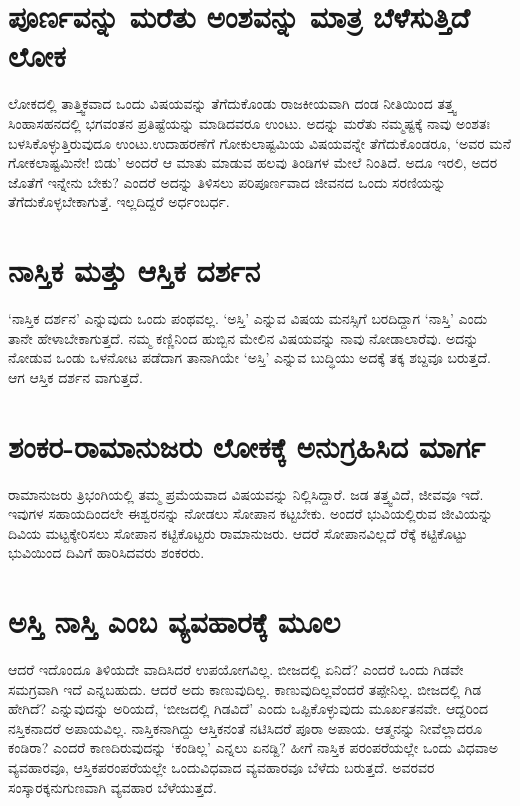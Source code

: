 \section*{ಪೂರ್ಣವನ್ನು ಮರೆತು ಅಂಶವನ್ನು ಮಾತ್ರ ಬೆಳೆಸುತ್ತಿದೆ ಲೋಕ}

ಲೋಕದಲ್ಲಿ ತಾತ್ತ್ವಿಕವಾದ ಒಂದು ವಿಷಯವನ್ನು ತೆಗೆದುಕೊಂಡು ರಾಜಕೀಯವಾಗಿ ದಂಡ ನೀತಿಯಿಂದ ತತ್ತ್ವ ಸಿಂಹಾಸಹನದಲ್ಲಿ ಭಗವಂತನ ಪ್ರತಿಷ್ಟೆಯನ್ನು ಮಾಡಿದವರೂ ಉಂಟು. ಅದನ್ನು ಮರೆತು ನಮ್ಮಷ್ಟಕ್ಕೆ ನಾವು ಅಂಶತಃ ಬಳಸಿಕೊಳ್ಳುತ್ತಿರುವುದೂ ಉಂಟು.ಉದಾಹರಣೆಗೆ ಗೋಕುಲಾಷ್ಟಮಿಯ ವಿಷಯವನ್ನೇ ತೆಗೆದುಕೊಂಡರೂ, `ಅವರ ಮನೆ ಗೋಕಲಾಷ್ಟಮಿನೇ! ಬಿಡು' ಅಂದರೆ ಆ ಮಾತು ಮಾಡುವ ಹಲವು ತಿಂಡಿಗಳ ಮೇಲೆ ನಿಂತಿದೆ. ಅದೂ ಇರಲಿ, ಅದರ ಜೊತೆಗೆ ಇನ್ನೇನು ಬೇಕು? ಎಂದರೆ ಅದನ್ನು ತಿಳಿಸಲು ಪರಿಪೂರ್ಣವಾದ ಜೀವನದ ಒಂದು ಸರಣಿಯನ್ನು ತೆಗೆದುಕೊಳ್ಳಬೇಕಾಗುತ್ತೆ. ಇಲ್ಲದಿದ್ದರೆ ಅರ್ಧಂಬರ್ಧ.

\section*{ನಾಸ್ತಿಕ ಮತ್ತು ಆಸ್ತಿಕ ದರ್ಶನ}

`ನಾಸ್ತಿಕ ದರ್ಶನ' ಎನ್ನುವುದು ಒಂದು ಪಂಥವಲ್ಲ. `ಅಸ್ತಿ' ಎನ್ನುವ ವಿಷಯ ಮನಸ್ಸಿಗೆ ಬರದಿದ್ದಾಗ `ನಾಸ್ತಿ' ಎಂದು ತಾನೇ ಹೇಳಾಬೇಕಾಗುತ್ತದೆ. ನಮ್ಮ ಕಣ್ಣಿನಿಂದ ಹುಬ್ಬಿನ ಮೇಲಿನ ವಿಷಯವನ್ನು ನಾವು ನೋಡಾಲಾರೆವು. ಅದನ್ನು ನೋಡುವ ಒಂಡು ಒಳನೋಟ ಪಡೆದಾಗ ತಾನಾಗಿಯೇ `ಅಸ್ತಿ' ಎನ್ನುವ ಬುದ್ಧಿಯು ಅದಕ್ಕೆ ತಕ್ಕ ಶಬ್ದವೂ ಬರುತ್ತದೆ. ಆಗ ಆಸ್ತಿಕ ದರ್ಶನ ವಾಗುತ್ತದೆ.

\section*{ಶಂಕರ-ರಾಮಾನುಜರು ಲೋಕಕ್ಕೆ ಅನುಗ್ರಹಿಸಿದ ಮಾರ್ಗ}

ರಾಮಾನುಜರು ತ್ರಿಭಂಗಿಯಲ್ಲಿ ತಮ್ಮ ಪ್ರಮೆಯವಾದ ವಿಷಯವನ್ನು ನಿಲ್ಲಿಸಿದ್ದಾರೆ. ಜಡ ತತ್ತ್ವವಿದೆ, ಜೀವವೂ ಇದೆ. ಇವುಗಳ ಸಹಾಯದಿಂದಲೇ ಈಶ್ವರನನ್ನು ನೋಡಲು ಸೋಪಾನ ಕಟ್ಟಬೇಕು. ಅಂದರೆ ಭುವಿಯಲ್ಲಿರುವ ಜೀವಿಯನ್ನು ದಿವಿಯ ಮಟ್ಟಕ್ಕೇರಿಸಲು ಸೋಪಾನ ಕಟ್ಟಿಕೊಟ್ಟರು ರಾಮಾನುಜರು. ಆದರೆ ಸೋಪಾನವಿಲ್ಲದೆ ರೆಕ್ಕೆ  ಕಟ್ಟಿಕೊಟ್ಟು ಭುವಿಯಿಂದ ದಿವಿಗೆ ಹಾರಿಸಿದವರು ಶಂಕರರು.

\section*{ಅಸ್ತಿ ನಾಸ್ತಿ ಎಂಬ ವ್ಯವಹಾರಕ್ಕೆ ಮೂಲ}

ಆದರೆ ಇದೊಂದೂ ತಿಳಿಯದೇ ವಾದಿಸಿದರೆ ಉಪಯೋಗವಿಲ್ಲ. ಬೀಜದಲ್ಲಿ ಏನಿದೆ? ಎಂದರೆ ಒಂದು ಗಿಡವೇ ಸಮಗ್ರವಾಗಿ ಇದೆ ಎನ್ನಬಹುದು. ಆದರೆ ಅದು ಕಾಣುವುದಿಲ್ಲ. ಕಾಣುವುದಿಲ್ಲವೆಂದರೆ ತಪ್ಪೇನಿಲ್ಲ. ಬೀಜದಲ್ಲಿ ಗಿಡ ಹೇಗಿದೆ? ಎನ್ನುವುದನ್ನು ಅರಿಯದೆ, `ಬೀಜದಲ್ಲಿ ಗಿಡವಿದೆ' ಎಂದು ಒಪ್ಪಿಕೊಳ್ಳುವುದು ಮೂರ್ಖತನವೇ. ಆದ್ದರಿಂದ ನಸ್ತಿಕನಾದರೆ ಅಪಾಯವಿಲ್ಲ. ನಾಸ್ತಿಕನಾಗಿದ್ದು ಆಸ್ತಿಕನಂತೆ ನಟಿಸಿದರೆ ಪೂರಾ ಅಪಾಯ. ಆತ್ಮನನ್ನು ನೀವೆಲ್ಲಾದರೂ ಕಂಡಿರಾ? ಎಂದರೆ ಕಾಣದಿರುವುದನ್ನು `ಕಂಡಿಲ್ಲ' ಎನ್ನಲು ಏನಡ್ದಿ? ಹೀಗೆ ನಾಸ್ತಿಕ ಪರಂಪರೆಯಲ್ಲೇ ಒಂದು ವಿಧವಾಅ ವ್ಯವಹಾರವೂ, ಆಸ್ತಿಕಪರಂಪರೆಯಲ್ಲೇ ಒಂದುವಿಧವಾದ ವ್ಯವಹಾರವೂ ಬೆಳೆದು ಬರುತ್ತದೆ. ಅವರವರ ಸಂಸ್ಕಾರಕ್ಕನುಗುಣವಾಗಿ ವ್ಯವಹಾರ ಬೆಳೆಯುತ್ತದೆ.

